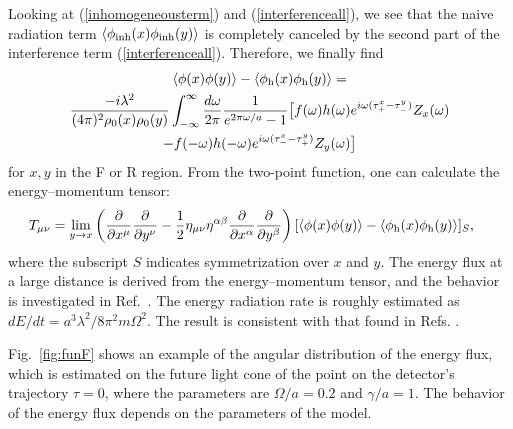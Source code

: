 \documentclass[aps,prd,preprintnumbers,nofootinbib,showpacs,11pt]{revtex4}%
\begin{document}
\begin{widetext}
Looking at (\ref{inhomogeneousterm}) and 
(\ref{interferenceall}),
we see that the naive radiation term $\langle\phi_{\rm inh}(x)\phi_{\rm inh}(y)\rangle$
is completely canceled by
the second part of the interference term (\ref{interferenceall}).
Therefore, we finally find 
\begin{multline}
\langle\phi(x)\phi(y)\rangle-\langle\phi_{\rm h}(x)\phi_{\rm h}(y)\rangle=\\
{-i\lambda^2\over (4\pi)^2\rho_0(x)\rho_0(y)}
  \int _{-\infty}^{\infty}{d\omega\over2\pi}{1\over e^{2\pi\omega/a}-1}
\bigr[f(\omega)h(\omega)e^{i\omega(\tau_+^x-\tau_-^y)}Z_x(\omega)\\
-f(-\omega)h(-\omega)e^{i\omega(\tau_-^x-\tau_+^y)}Z_y(\omega)\bigl]
\label{interferencew}
\end{multline}
for $x,y$ in the F or R region. 
%
From the two-point function, one can calculate the energy--momentum tensor:
\begin{eqnarray}
\hspace{-4mm}
T_{\mu\nu}
=\lim_{y\rightarrow x}\left({\partial\over \partial x^\mu }{\partial\over \partial y^\nu }-{1\over 2}
\eta_{\mu\nu}\eta^{\alpha\beta}{\partial\over \partial x^\alpha }{\partial\over \partial y^\beta }\right)
[\langle\phi(x)\phi(y)\rangle-\langle\phi_{\rm h}(x)\phi_{\rm h}(y)\rangle]_S,
\end{eqnarray} 
where the subscript $S$ indicates symmetrization over $x$ and $y$. 
The energy flux at a large distance is derived from the energy--momentum tensor, 
and the behavior is investigated in Ref.~\cite{IOTYZ}. 
The energy radiation rate is roughly estimated as $dE/dt=a^3\lambda^2/8\pi^2m\Omega^2$. 
The result is consistent with that found in Refs. \cite{LH,LH2}.

Fig.~\ref{fig:funF} shows an example of the angular distribution of the energy flux, 
which is estimated on the future light cone of the point on the detector's 
trajectory $\tau=0$, where the parameters are $\Omega/a=0.2$ and $\gamma/a=1$.  
The behavior of the energy flux depends on the parameters of the model. 





\end{widetext}
\end{document}
